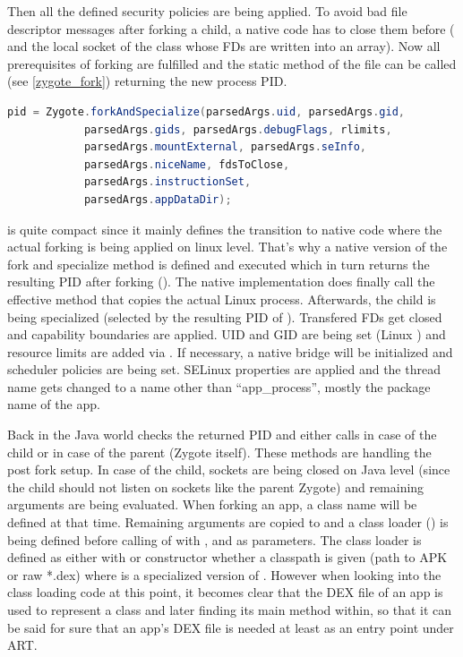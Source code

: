 Then all the defined security policies are being applied. To avoid bad file
descriptor messages after forking a child, a native code has to close them before ( and the local socket  of the
 class whose FDs are written into an 
array).
Now all prerequisites of forking are fulfilled and the static method
 of the  file can be called
(see \autoref{zygote_fork}) returning the new process PID.
\begin{lstlisting}[language=Java, caption=Zygote Fork Call, label=zygote_fork]
pid = Zygote.forkAndSpecialize(parsedArgs.uid, parsedArgs.gid,
            parsedArgs.gids, parsedArgs.debugFlags, rlimits,
            parsedArgs.mountExternal, parsedArgs.seInfo,
            parsedArgs.niceName, fdsToClose,
            parsedArgs.instructionSet,
            parsedArgs.appDataDir);
\end{lstlisting}
 is quite compact since it mainly defines the transition
to native code where the actual forking is being applied on linux level. That's why
a native version of the fork and specialize method is defined and executed
which in turn returns the resulting PID after forking
().
The native implementation does finally call the effective  method
that copies the actual Linux process. Afterwards, the child is being
specialized (selected by the resulting PID of ).
Transfered FDs get closed and capability boundaries are applied.
UID and GID are being set (Linux ) and resource limits are added via .
If necessary, a native bridge will be initialized and scheduler policies
are being set. SELinux properties are applied and the thread name gets
changed to a name other than ``app\_process'', mostly the package name of the app.

Back in the Java world  checks the returned PID and either calls  in case of the child or
 in case of the parent (Zygote itself).
These methods are handling the post fork setup. In case of the child, sockets are being closed on Java level (since the child should not listen on sockets like the parent Zygote) and remaining arguments are being evaluated. When forking an app, a class name will be defined at that time. Remaining arguments are copied to  and a class loader () is being defined before calling  of  with ,  and  as parameters. The class loader  is defined as
either with  or  constructor whether a classpath is
given (path to APK or raw *.dex) where  is a specialized version of .
However when looking into the class loading code at this point, it becomes clear that the DEX file of an app is used to represent a class and later finding its main method within, so that
it can be said for sure that an app's DEX file is needed at least as an entry point under ART.

